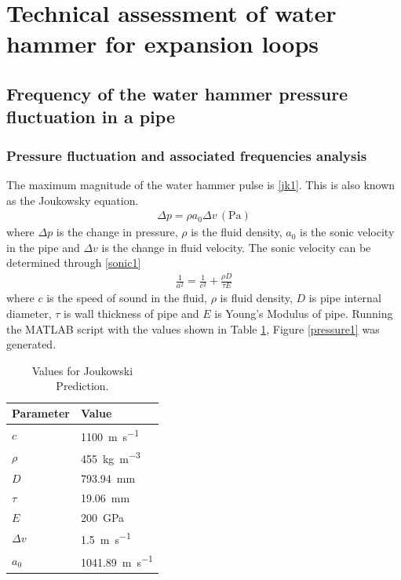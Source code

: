 \section{Technical assessment of water hammer for expansion loops}
\subsection{Frequency of the water hammer pressure fluctuation in a pipe}
\subsubsection{Pressure fluctuation and associated frequencies analysis}
The maximum magnitude of the water hammer pulse is \eqref{jk1}. This is also known as the Joukowsky equation.
\begin{gather}\label{jk1}
    \Delta p = \rho a_0 \Delta v\, (\si{\pascal})
\end{gather}
where $\Delta p$ is the change in pressure, $\rho$ is the fluid density, $a_0$ is the sonic velocity in the pipe and $\Delta v$ is the change in fluid velocity. The sonic velocity can be determined through \eqref{sonic1}
\begin{gather}\label{sonic1}
    \frac{1}{a^2} = \frac{1}{c^2} + \frac{\rho D }{\tau E}
\end{gather}
where $c$ is the speed of sound in the fluid, $\rho$ is fluid density, $D$ is pipe internal diameter, $\tau$ is wall thickness of pipe and $E$ is Young's Modulus of pipe. Running the MATLAB script with the values shown in Table \ref{matlabScriptVals}, Figure \ref{pressure1} was generated.
\begin{table}[H]
    \centering
    \begin{tabular}{@{}ll@{}}
        \toprule
        \textbf{Parameter} & \textbf{Value}\\
        \midrule
        $c$ & \SI{1100}{\meter\per\second}\\
        $\rho$ & \SI{455}{\kilo\gram\per\meter\cubed}\\
        $D$ & \SI{793.94}{\milli\meter}\\
        $\tau$ & \SI{19.06}{\milli\meter}\\
        $E$ & \SI{200}{\giga\pascal}\\
        $\Delta v$ & \SI{1.5}{\meter\per\second}\\
        $a_0$ & \SI{1041.89}{\meter\per\second}\\
        \bottomrule
    \end{tabular}
    \caption{Values for Joukowski Prediction.}
    \label{matlabScriptVals}
\end{table}
